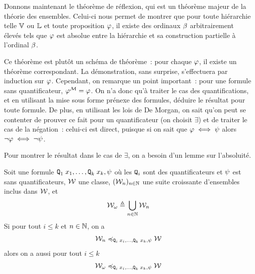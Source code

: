 Donnons maintenant le théorème de réflexion, qui est un théorème majeur de la
théorie des ensembles. Celui-ci nous permet de montrer que pour toute hiérarchie
telle $\mathbb V$ ou $\mathbb L$ et toute proposition $\varphi$, il existe des ordinaux
$\beta$ arbitrairement élevés tels que $\varphi$ est absolue entre la hiérarchie
et sa construction partielle à l'ordinal $\beta$.

Ce théorème est plutôt un schéma de théorème~: pour chaque $\varphi$, il existe
un théorème correspondant. La démonstration, sans surprise, s'effectuera par
induction sur $\varphi$. Cependant, on remarque un point important~: pour une
formule sans quantificateur, $\varphi^{\mathcal{M}} = \varphi$. On n'a donc qu'à
traiter le cas des quantifications, et en utilisant la mise sous forme prénexe
des formules, déduire le résultat pour toute formule. De plus, en utilisant les
lois de De Morgan, on sait qu'on peut se contenter de prouver ce fait pour un
quantificateur (on choisit $\exists$) et de traiter le cas de la négation~:
celui-ci est direct, puisque si on sait que $\varphi \iff \psi$ alors
$\lnot\varphi \iff \lnot \psi$.

Pour montrer le résultat dans le cas de $\exists$, on a besoin d'un lemme sur
l'absoluité.

\begin{lemma}\label{lem.refl1}
  Soit une formule ${\normalfont\texttt{Q}}_1\; x_1,\ldots,{\normalfont\texttt{Q}}_k\;x_k, \psi$ où les
  ${\normalfont\texttt{Q}}_i$ sont des quantificateurs et $\psi$ est sans quantificateurs,
  $\mathcal{W}$ une classe, $(\mathcal{W}_n)_{n\in \mathbb N}$ une suite croissante d'ensembles
  inclus dans $\mathcal{W}$, et
  \[\mathcal{W}_\omega \triangleq \bigcup_{n \in \mathbb N} \mathcal{W}_n\]
  Si pour tout $i \leq k$ et $n \in \mathbb N$, on a
  \[\mathcal{W}_n \preccurlyeq_{{\normalfont\texttt{Q}}_i\;x_i,\ldots,{\normalfont\texttt{Q}}_k\;x_k,\psi} \mathcal{W}\]
  alors on a aussi pour tout $i \leq k$
  \[\mathcal{W}_\omega \preccurlyeq_{{\normalfont\texttt{Q}}_i\; x_i,\ldots, {\normalfont\texttt{Q}}_k\;x_k, \psi}\mathcal{W}\]
\end{lemma}

